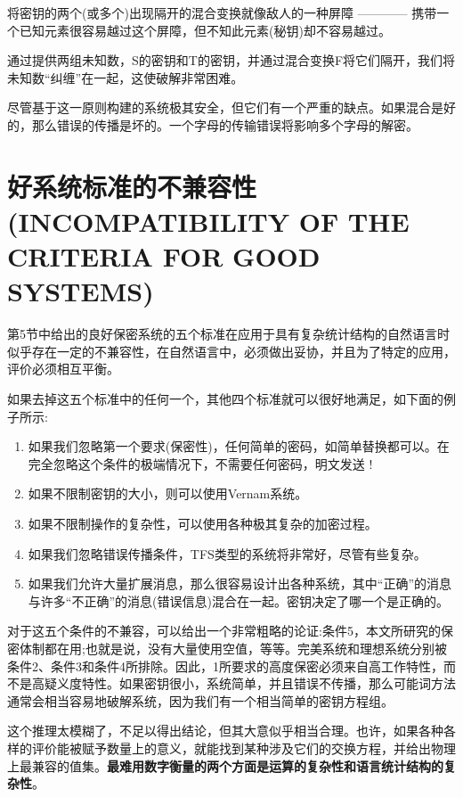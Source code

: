 \documentclass[]{article}
\begin{document}
将密钥的两个(或多个)出现隔开的混合变换就像敌人的一种屏障 ———— 携带一个已知元素很容易越过这个屏障，但不知此元素(秘钥)却不容易越过。

通过提供两组未知数，S的密钥和T的密钥，并通过混合变换F将它们隔开，我们将未知数“纠缠”在一起，这使破解非常困难。

尽管基于这一原则构建的系统极其安全，但它们有一个严重的缺点。如果混合是好的，那么错误的传播是坏的。一个字母的传输错误将影响多个字母的解密。

\newpage
%   
%

\section{好系统标准的不兼容性(INCOMPATIBILITY OF THE CRITERIA FOR GOOD SYSTEMS)}

第5节中给出的良好保密系统的五个标准在应用于具有复杂统计结构的自然语言时似乎存在一定的不兼容性，在自然语言中，必须做出妥协，并且为了特定的应用，评价必须相互平衡。

如果去掉这五个标准中的任何一个，其他四个标准就可以很好地满足，如下面的例子所示:
\begin{enumerate}
	\item  如果我们忽略第一个要求(保密性)，任何简单的密码，如简单替换都可以。在完全忽略这个条件的极端情况下，不需要任何密码，明文发送 !
	\item 如果不限制密钥的大小，则可以使用Vernam系统。
	\item 如果不限制操作的复杂性，可以使用各种极其复杂的加密过程。
	\item 如果我们忽略错误传播条件，TFS类型的系统将非常好，尽管有些复杂。
	\item 如果我们允许大量扩展消息，那么很容易设计出各种系统，其中“正确”的消息与许多“不正确”的消息(错误信息)混合在一起。密钥决定了哪一个是正确的。
\end{enumerate}

对于这五个条件的不兼容，可以给出一个非常粗略的论证:条件5，本文所研究的保密体制都在用;也就是说，没有大量使用空值，等等。完美系统和理想系统分别被条件2、条件3和条件4所排除。因此，1所要求的高度保密必须来自高工作特性，而不是高疑义度特性。如果密钥很小，系统简单，并且错误不传播，那么可能词方法通常会相当容易地破解系统，因为我们有一个相当简单的密钥方程组。

这个推理太模糊了，不足以得出结论，但其大意似乎相当合理。也许，如果各种各样的评价能被赋予数量上的意义，就能找到某种涉及它们的交换方程，并给出物理上最兼容的值集。\textbf{最难用数字衡量的两个方面是运算的复杂性和语言统计结构的复杂性}。
\end{document}
